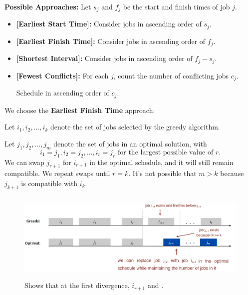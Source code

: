 \textbf{Possible Approaches:} Let $s_j$ and $f_j$ be the start and finish times of job $j$.
\begin{itemize}
    \item \textbf{[Earliest Start Time]:} Consider jobs in ascending order of $s_j$.
    \item \textbf{[Earliest Finish Time]:} Consider jobs in ascending order of $f_j$.
    \item \textbf{[Shortest Interval]:} Consider jobs in ascending order of $f_j - s_j$.
    \item \textbf{[Fewest Conflicts]:} For each $j$, count the number of conflicting jobs $c_j$. \par
    \hspace{9.3em} Schedule in ascending order of $c_j$.
\end{itemize}
\noindent
We choose the \textbf{Earliest Finish Time} approach:
\begin{Proof}
    Let $i_1, i_2, \dots, i_k$ denote the set of jobs selected by the greedy algorithm.
    
    Let $j_1, j_2, \dots, j_m$ denote the set of jobs in an optimal solution, with
    \[
    i_1 = j_1, i_2 = j_2, \dots, i_r = j_r \text{ for the largest possible value of } r.
    \]
    \noindent
    We can swap $j_{r+1}$ for $i_{r+1}$ in the optimal schedule, and it will still remain compatible. We repeat swaps until $r = k$.
    It’s not possible that $m > k$ because $j_{k+1}$ is compatible with $i_k$.
    \end{Proof}
   \begin{figure}[h]
    \begin{center}
      \includegraphics[height=1.7in]{./Sections/sched/interval/interval_proof.png}
    \end{center}
     \caption{Shows that at the first divergence, $i_{r+1}$ and .}\label{fig:interval_proof}
\end{figure}

\newpage 

